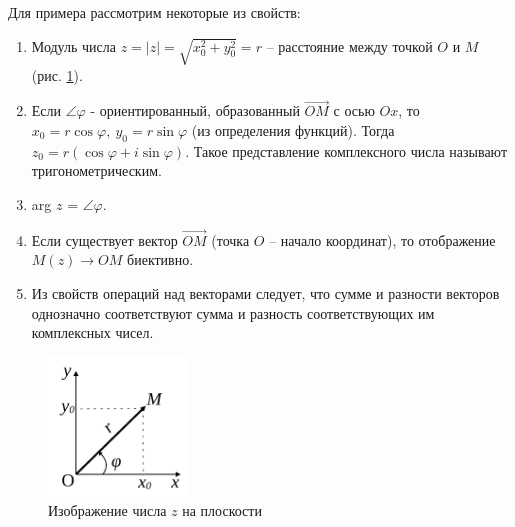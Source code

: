 Для примера рассмотрим некоторые из свойств:
\begin{enumerate}
   \item Модуль числа $z = \vert z\vert = \sqrt{x_0^2+y_0^2} = r$ -- расстояние между точкой
         \(O\) и \(M\) (рис. \ref{theory-1}).
   \item Если $\angle \varphi$ - ориентированный, образованный $\overrightarrow{OM}$
         с осью \(Ox\), то $x_0 = r\cos \varphi,~y_0 = r\sin \varphi$ (из определения функций).
         Тогда $z_0 = r(\cos \varphi + i \sin \varphi)$. Такое представление комплексного
         числа называют тригонометрическим.
   \item arg $z$ = $\angle \varphi$.
   \item Если существует вектор \(\overrightarrow{OM}\) (точка \(O\) -- начало координат),
         то отображение \(M(z) \rightarrow OM\) биективно.
   \item Из свойств операций над векторами следует, что сумме и разности векторов однозначно
         соответствуют сумма и разность соответствующих им комплексных чисел.
         \label{theory-properties}
\end{enumerate}
\begin{figure}[ht]
   \centering
   \includegraphics[width=0.33\textwidth]{images/theory-1}
   \caption{Изображение числа \(z\) на плоскости}
   \label{theory-1}
\end{figure}

